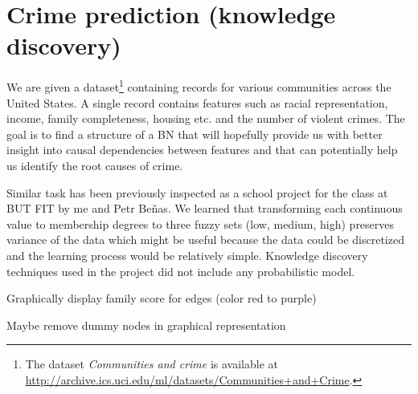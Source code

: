 \documentclass[english,cover]{fitthesis} %
\newcommand{\todo}[1]{{\color{red}#1}}
\begin{document}





\section{Crime prediction (knowledge discovery)}
We are given a dataset\footnote{The dataset \emph{Communities and crime} is available at \url{http://archive.ics.uci.edu/ml/datasets/Communities+and+Crime}.} containing records for various communities across the United States. A single record contains features such as racial representation, income, family completeness, housing etc. and the number of violent crimes. The goal is to find a structure of a BN that will hopefully provide us with better insight into causal dependencies between features and that can potentially help us identify the root causes of crime.

Similar task has been previously inspected as a school project for the  class at BUT FIT by me and Petr Beňas. We learned that transforming each continuous value to membership degrees to three fuzzy sets (low, medium, high) preserves variance of the data which might be useful because the data could be discretized and the learning process would be relatively simple. Knowledge discovery techniques used in the project did not include any probabilistic model.

\todo{Graphically display family score for edges (color red to purple)}

\todo{Maybe remove dummy nodes in graphical representation}
\end{document}

